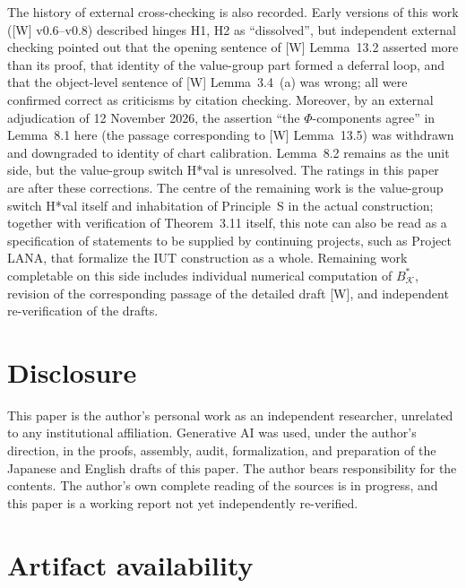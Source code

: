 \documentclass[11pt]{article}
\newcommand{\cK}{\mathcal K}
\begin{document}
The history of external cross-checking is also recorded.  Early
versions of this work ([W] v0.6--v0.8) described hinges H1, H2 as
``dissolved'', but independent external checking pointed out that
the opening sentence of [W] Lemma~13.2 asserted more than its proof,
that identity of the value-group part formed a deferral loop, and
that the object-level sentence of [W] Lemma~3.4~(a) was wrong; all
were confirmed correct as criticisms by citation checking.
Moreover, by an external adjudication of 12 November 2026, the
assertion ``the $\Phi$-components agree'' in Lemma~8.1 here (the
passage corresponding to [W] Lemma~13.5) was withdrawn and
downgraded to identity of chart calibration.  Lemma~8.2 remains as
the unit side, but the value-group switch H*val is unresolved.  The
ratings in this paper are after these corrections.  The centre of
the remaining work is the value-group switch H*val itself and
inhabitation of Principle~S in the actual construction; together
with verification of Theorem~3.11 itself, this note can also be
read as a specification of statements to be supplied by continuing
projects, such as Project LANA, that formalize the IUT construction
as a whole.  Remaining work completable on this side includes
individual numerical computation of $B_{\cK}^{*}$, revision of the
corresponding passage of the detailed draft [W], and independent
re-verification of the drafts.

\section*{Disclosure}

This paper is the author's personal work as an independent
researcher, unrelated to any institutional affiliation.  Generative
AI was used, under the author's direction, in the proofs, assembly,
audit, formalization, and preparation of the Japanese and English
drafts of this paper.  The author bears responsibility for the
contents.  The author's own complete reading of the sources is in
progress, and this paper is a working report not yet independently re-verified.

\section*{Artifact availability}
\end{document}
